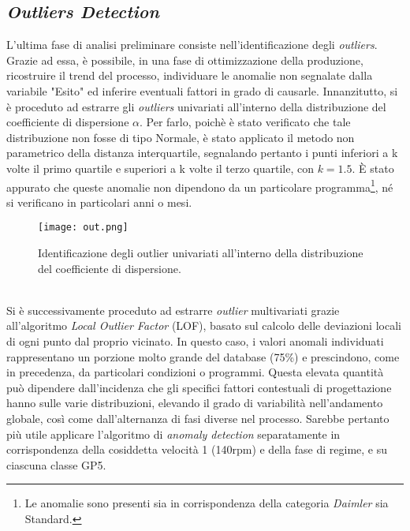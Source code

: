 \documentclass[fleqn,10pt]{SelfArx} %
\begin{document}
\subsection{\textit{Outliers Detection}}
L'ultima fase di analisi preliminare consiste nell'identificazione degli \textit{outliers}. Grazie ad essa, è possibile, in una fase di ottimizzazione della produzione, ricostruire il trend del processo, individuare le anomalie non segnalate dalla variabile "Esito" ed inferire eventuali fattori in grado di causarle. Innanzitutto, si è proceduto ad estrarre gli \textit{outliers} univariati all'interno della distribuzione del coefficiente di dispersione $\alpha$. Per farlo, poichè è stato verificato che tale distribuzione non fosse di tipo Normale, è stato applicato il metodo non parametrico della distanza interquartile, segnalando pertanto i punti inferiori a k volte il primo quartile e superiori a k volte il terzo quartile, con $k = 1.5$. È stato appurato che queste anomalie non dipendono da un particolare programma\footnote{Le anomalie sono presenti sia in corrispondenza della categoria \textit{Daimler} sia Standard.}, né si verificano in particolari anni o mesi.
\begin{figure}[h]
    \centering
    \texttt{[image: out.png]}
    \label{fig:em}
    \caption{Identificazione degli outlier univariati all'interno della distribuzione del coefficiente di dispersione.}
\end{figure}
\\
Si è successivamente proceduto ad estrarre \textit{outlier} multivariati grazie all'algoritmo \textit{Local Outlier Factor} (LOF), basato sul calcolo delle deviazioni locali di ogni punto dal proprio vicinato. In questo caso, i valori anomali individuati rappresentano un porzione molto grande del database (75\%) e prescindono, come in precedenza, da particolari condizioni o programmi. Questa elevata quantità può dipendere dall'incidenza che gli specifici fattori contestuali di progettazione hanno sulle varie distribuzioni, elevando il grado di variabilità nell'andamento globale, così come dall'alternanza di fasi diverse nel processo. Sarebbe pertanto più utile applicare l'algoritmo di \textit{anomaly detection} separatamente in corrispondenza della cosiddetta velocità 1 (140rpm) e della fase di regime, e su ciascuna classe GP5.
\end{document}
